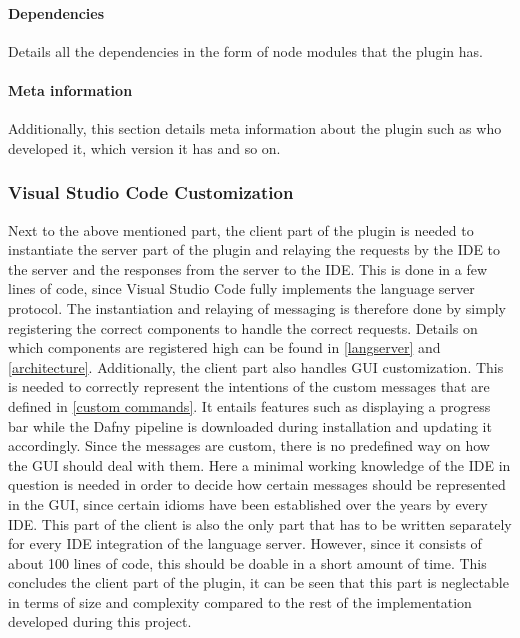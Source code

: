\paragraph{Dependencies}
Details all the dependencies in the form of node modules that the plugin has.

\paragraph{Meta information}
Additionally, this section details meta information about the plugin such as who developed it, which version it has and so on.

\subsubsection{Visual Studio Code Customization}
Next to the above mentioned part, the client part of the plugin is needed to instantiate the server part of the plugin and relaying the requests by the IDE to the server and the responses from the server to the IDE. This is done in a few lines of code, since Visual Studio Code fully implements the language server protocol. The instantiation and relaying of messaging is therefore done by simply registering the correct components to handle the correct requests. Details on which components are registered high can be found in \ref{langserver} and \ref{architecture}.\newline
Additionally, the client part also handles GUI customization. This is needed to correctly represent the intentions of the custom messages that are defined in \ref{custom commands}. It entails features such as displaying a progress bar while the Dafny pipeline is downloaded during installation and updating it accordingly. Since the messages are custom, there is no predefined way on how the GUI should deal with them. Here a minimal working knowledge of the IDE in question is needed in order to decide how certain messages should be represented in the GUI, since certain idioms have been established over the years by every IDE. \newline
This part of the client is also the only part that has to be written separately for every IDE integration of the language server. However, since it consists of about 100 lines of code, this should be doable in a short amount of time. This concludes the client part of the plugin, it can be seen that this part is neglectable in terms of size and complexity compared to the rest of the implementation developed during this project. 

